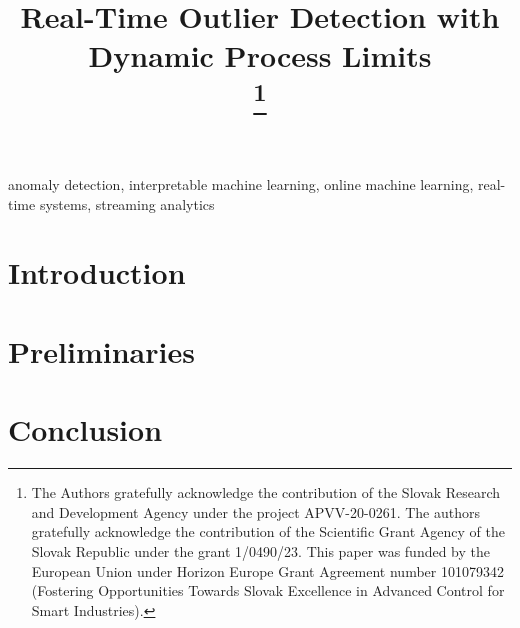 \documentclass[conference]{IEEEtran}
\begin{document}
\title{Real-Time Outlier Detection with Dynamic Process Limits\\

    \thanks{The Authors gratefully acknowledge the contribution of the Slovak Research and Development Agency under the project APVV-20-0261. The authors gratefully acknowledge the contribution of the Scientific Grant Agency of the Slovak Republic under the grant 1/0490/23. This paper was funded by the European Union under Horizon Europe Grant Agreement number 101079342 (Fostering Opportunities Towards Slovak Excellence in Advanced Control for Smart Industries).}
}

\author{
    \and
}

\maketitle

\begin{abstract}
    
\end{abstract}

\begin{IEEEkeywords}
    anomaly detection, interpretable machine learning, online machine learning, real-time systems, streaming analytics
\end{IEEEkeywords}

\section{Introduction}\label{Introduction}


\section{Preliminaries}


\section{Conclusion}




\end{document}
